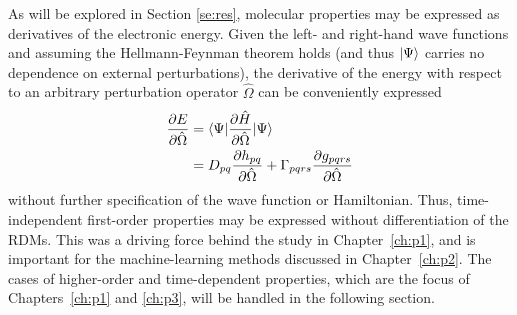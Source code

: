 As will be explored in Section \ref{se:res}, molecular properties may be expressed as 
derivatives of the electronic energy.\cite{Helgaker2012} Given the left- and right-hand wave functions 
and assuming the Hellmann-Feynman theorem\cite{Hellmann1937,Feynman1939} holds 
(and thus $| \Psi \rangle$ carries no dependence 
on external perturbations), the derivative of the energy with respect to an arbitrary 
perturbation operator 
$\hat\Omega$ can be conveniently expressed
\begin{equation} \label{eq:dE}
    \begin{aligned}
    \frac{\partial E}{\partial \hat\Omega} &= \langle\Psi |\frac{\partial \hat{H}}{\partial \hat\Omega}| \Psi \rangle\\
                                  &= D_{pq}\frac{\partial h_{pq}}{\partial \hat\Omega} + \Gamma_{pqrs}\frac{\partial g_{pqrs}}{\partial \hat\Omega}
    \end{aligned}
\end{equation}
without further specification of the wave function or Hamiltonian. 
Thus, time-independent first-order properties may be expressed without 
differentiation of the RDMs. This was a driving force behind the study in 
Chapter~\ref{ch:p1}, and is important for the machine-learning methods discussed in Chapter~\ref{ch:p2}. The cases of 
higher-order and time-dependent properties, which are the
focus of Chapters~\ref{ch:p1} and \ref{ch:p3}, will be handled in the following section. 
